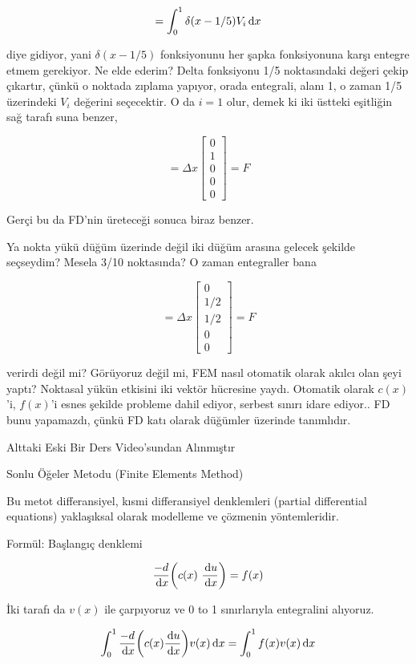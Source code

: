 \documentclass[12pt,fleqn]{article}\usepackage{../../common}
\begin{document}
$$
= \int _{0}^{1} \delta (x-1/5) V_i \,\mathrm{d} x
$$

diye gidiyor, yani $\delta (x-1/5)$ fonksiyonunu her şapka fonksiyonuna karşı
entegre etmem gerekiyor. Ne elde ederim? Delta fonksiyonu 1/5 noktasındaki
değeri çekip çıkartır, çünkü o noktada zıplama yapıyor, orada entegrali, alanı
1, o zaman 1/5 üzerindeki $V_i$ değerini seçecektir. O da $i=1$ olur, demek ki
iki üstteki eşitliğin sağ tarafı suna benzer,

$$
= \Delta x
\left[\begin{array}{r}
0 \\ 1 \\ 0 \\ 0 \\ 0
\end{array}\right] = F
$$

Gerçi bu da FD'nin üreteceği sonuca biraz benzer.

Ya nokta yükü düğüm üzerinde değil iki düğüm arasına gelecek şekilde seçseydim?
Mesela 3/10 noktasında? O zaman entegraller bana

$$
= \Delta x
\left[\begin{array}{r}
0 \\ 1/2 \\ 1/2 \\ 0 \\ 0
\end{array}\right] = F
$$

verirdi değil mi? Görüyoruz değil mi, FEM nasıl otomatik olarak akılcı olan şeyi
yaptı? Noktasal yükün etkisini iki vektör hücresine yaydı. Otomatik olarak
$c(x)$'i, $f(x)$'i esnes şekilde probleme dahil ediyor, serbest sınırı idare
ediyor..  FD bunu yapamazdı, çünkü FD katı olarak düğümler üzerinde tanımlıdır.

\newpage

Alttaki Eski Bir Ders Video'sundan Alınmıştır

Sonlu Öğeler Metodu (Finite Elements Method)

Bu metot differansiyel, kısmi differansiyel denklemleri (partial differential
equations) yaklaşıksal olarak modelleme ve çözmenin yöntemleridir.

Formül: Başlangıç denklemi

$$ \frac{-d}{\,\mathrm{d} x} \bigg( c(x) \ \frac{\,\mathrm{d} u}{\,\mathrm{d} x} \bigg) = f(x) $$

İki tarafı da  $v(x)$ ile çarpıyoruz ve 0 to 1 sınırlarıyla entegralini alıyoruz.

$$
\int_0^1 \frac{-d}{\,\mathrm{d} x} \bigg( c(x) \frac{\,\mathrm{d} u}{\,\mathrm{d} x} \bigg) v(x)\,\mathrm{d} x
= \int_0^1 f(x)v(x) \,\mathrm{d} x
$$
\end{document}
